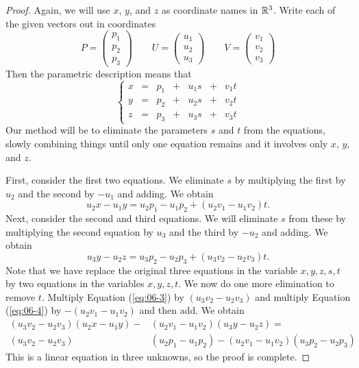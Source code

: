 \documentclass[elementsmain.tex]{subfiles}
\begin{document}
\begin{proof} Again, we will use $x$, $y$, and $z$ as coordinate names in $\mathbb{R}^3$.
Write each of the given vectors out in coordinates
\[
P = \begin{pmatrix} p_1 \\ p_2 \\ p_3 \end{pmatrix} \qquad
U = \begin{pmatrix} u_1 \\ u_2 \\ u_3 \end{pmatrix} \qquad
V = \begin{pmatrix} v_1 \\ v_2 \\ v_3 \end{pmatrix} 
\]
Then the parametric description means that 
\[
\left\{
\begin{array}{rrrrrrr}
x & = &  p_1 & + & u_1 s & + & v_1 t \\
y & = &  p_2 & + & u_2 s & + & v_2 t \\
z & = &  p_3 & + & u_3 s & + & v_3 t 
\end{array}\right.
\]
Our method will be to eliminate the parameters $s$ and $t$ from the equations, slowly combining things until only one equation remains and it involves only $x$, $y$, and $z$.

First, consider the first two equations. We eliminate $s$ by multiplying the first by $u_2$ and the second by $-u_1$ and adding. We obtain
\begin{equation}\label{eq:06-3}
u_2 x - u_1 y = u_2 p_1 - u_1 p_2 + (u_2 v_1 - u_1 v_2 ) t.
\end{equation}
Next, consider the second and third equations. We will eliminate $s$ from these by multiplying the second equation by $u_3$ and the third by $-u_2$ and adding. We obtain
\begin{equation}\label{eq:06-4}
u_3 y - u_2 z = u_3 p_2 - u_2 p_3 + (u_3 v_2 - u_2 v_3 ) t.
\end{equation}
Note that we have replace the original three equations in the variable $x,y,z,s,t$ by two equations in the variables $x,y,z,t$. We now do one more elimination to remove $t$. Multiply Equation (\ref{eq:06-3}) by $(u_3v_2 - u_2 v_3)$ and multiply Equation (\ref{eq:06-4}) by $-(u_2 v_1 - u_1 v_2 )$ and then add. We obtain
\begin{equation}\label{eq:06-nasty}
\begin{split}
(u_3v_2 - u_2 v_3)(u_2 x - u_1 y) - & (u_2 v_1 - u_1 v_2 )(u_3 y - u_2 z) = \\
 (u_3v_2 - u_2 v_3)&(u_2 p_1 - u_1 p_2) - (u_2 v_1 - u_1 v_2 )(u_3 p_2 - u_2 p_3)
\end{split}
\end{equation}
This is a linear equation in three unknowns, so the proof is complete.
\end{proof}
\end{document}
